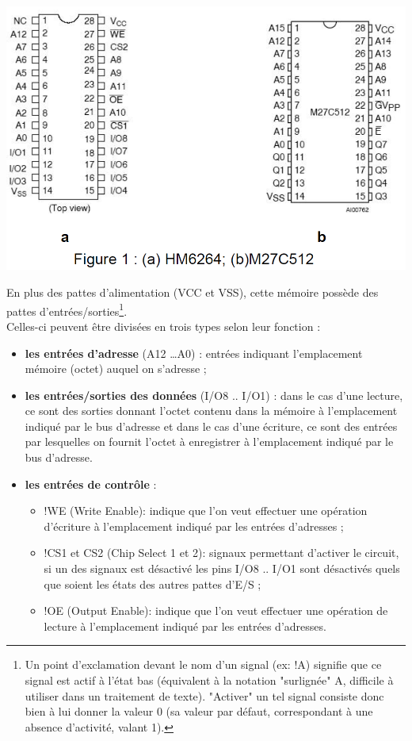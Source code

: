 \begin{center}
\includegraphics[scale=0.6]{Labo3_AnnexeB.png}
\end{center}

En plus des pattes d’alimentation (VCC et VSS), cette mémoire possède des pattes d'entrées/sorties\footnote{Un point d'exclamation devant le nom d'un signal (ex: !A) signifie que ce signal est actif à l'état bas (équivalent à la notation "surlignée" A, difficile à utiliser dans un traitement de texte). "Activer" un tel signal consiste donc bien à lui donner la valeur 0 (sa valeur par défaut, correspondant à une absence d'activité, valant 1).}.\\

Celles-ci peuvent être divisées en trois types selon leur fonction :

\begin{itemize}
\item \textbf{les entrées d’adresse} (A12 …A0) : entrées indiquant l’emplacement mémoire (octet) auquel on s’adresse ;
\item \textbf{les entrées/sorties des données} (I/O8 .. I/O1) : dans le cas d’une lecture, ce sont des sorties donnant l’octet contenu dans la mémoire à l’emplacement indiqué par le bus d’adresse et dans le cas d’une écriture, ce sont des entrées par lesquelles on fournit l’octet à enregistrer à l’emplacement indiqué par le bus d’adresse.
\item \textbf{les entrées de contrôle} :
	\begin{itemize}
	\item !WE (Write Enable): indique que l’on veut effectuer une opération d’écriture à l’emplacement indiqué par les entrées d’adresses ;
	\item !CS1 et CS2 (Chip Select 1 et 2): signaux permettant d’activer le circuit, si un des signaux est désactivé les pins I/O8 .. I/O1 sont désactivés quels que soient les états des autres pattes d’E/S ;
	\item !OE (Output Enable): indique que l’on veut effectuer une opération de lecture à l’emplacement indiqué par les entrées d’adresses.
	\end{itemize}
\end{itemize}

